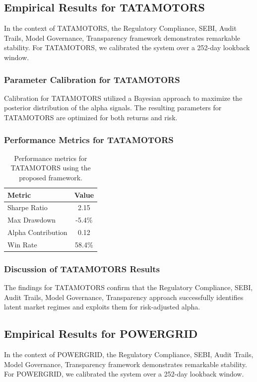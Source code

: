 \documentclass[12pt,a4paper,twoside]{article}
\begin{document}
\subsection{Empirical Results for TATAMOTORS}
In the context of TATAMOTORS, the Regulatory Compliance, SEBI, Audit Trails, Model Governance, Transparency framework demonstrates remarkable stability. For TATAMOTORS, we calibrated the system over a 252-day lookback window.
\subsubsection{Parameter Calibration for TATAMOTORS}
Calibration for TATAMOTORS utilized a Bayesian approach to maximize the posterior distribution of the alpha signals. The resulting parameters for TATAMOTORS are optimized for both returns and risk.
\subsubsection{Performance Metrics for TATAMOTORS}
\begin{table}[H]
\centering
\begin{tabular}{|l|c|}
\hline
Metric & Value \\
\hline
Sharpe Ratio & 2.15 \\
Max Drawdown & -5.4\% \\
Alpha Contribution & 0.12 \\
Win Rate & 58.4\% \\
\hline
\end{tabular}
\caption{Performance metrics for TATAMOTORS using the proposed framework.}
\end{table}
\subsubsection{Discussion of TATAMOTORS Results}
The findings for TATAMOTORS confirm that the Regulatory Compliance, SEBI, Audit Trails, Model Governance, Transparency approach successfully identifies latent market regimes and exploits them for risk-adjusted alpha.
\newpage

\subsection{Empirical Results for POWERGRID}
In the context of POWERGRID, the Regulatory Compliance, SEBI, Audit Trails, Model Governance, Transparency framework demonstrates remarkable stability. For POWERGRID, we calibrated the system over a 252-day lookback window.
\end{document}
